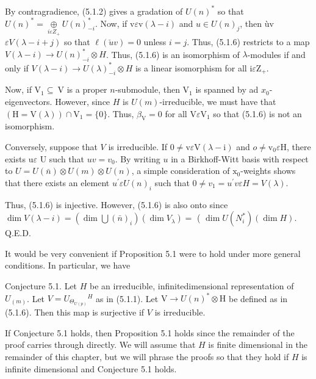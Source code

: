 \documentclass[10pt]{article}
\begin{document}
By contragradience, (5.1.2) gives a gradation of $U(n)^{*}$ so that $U(n)^{*}=\underset{i \varepsilon Z_{+}}{\oplus} U(n)_{-i}^{*}$. Now, if $\mathrm{v} \varepsilon \mathrm{v}(\lambda-i)$ and $u \in U(n)_{j}$, then ùv $\varepsilon V(\lambda-i+j)$ so that $\ell(\check{u} v)=0$ unless $i=j$. Thus, (5.1.6) restricts to a map $V(\lambda-i) \rightarrow U(n)_{-i}^{*} \otimes H$. Thus, (5.1.6) is an isomorphism of $\lambda$-modules if and only if $V(\lambda-i) \rightarrow U(\lambda)_{-i}^{*} \otimes H$ is a linear isomorphism for all $\mathrm{i} \varepsilon \mathrm{Z}_{+}$.

Now, if $\mathrm{V}_{1} \subseteq \mathrm{~V}$ is a proper $n$-submodule, then $\mathrm{V}_{1}$ is spanned by ad $x_{0}$-eigenvectors. However, since $H$ is $U(m)$-irreducible, we must have that $(\mathrm{H}=\mathrm{V}(\lambda)) \cap \mathrm{V}_{1}=\{0\}$. Thus, $\beta_{\mathrm{V}}=0$ for all $\mathrm{V} \varepsilon \mathrm{V}_{1}$ so that (5.1.6) is not an isomorphism.

Conversely, suppose that $V$ is irreducible. If $0 \neq \mathrm{v} \varepsilon \mathrm{V}(\lambda-\mathrm{i})$ and $o \neq \mathrm{v}_{0} \varepsilon \mathrm{H}$, there exists $\mathrm{u} \varepsilon$ U such that $u v=v_{0}$. By writing $u$ in a Birkhoff-Witt basis with respect to $U=U(\bar{n}) \otimes U(m) \otimes U(n)$, a simple consideration of $\mathrm{x}_{0}$-weights shows that there exists an element $u^{\prime} \varepsilon U(n)_{i}$ such that $0 \neq v_{1}=u^{\prime} v \varepsilon H=V(\lambda)$.

Thus, (5.1.6) is injective. However, (5.1.6) is also onto since $\operatorname{dim} V(\lambda-i)=\left(\operatorname{dim} \bigcup(\bar{n})_{i}\right)\left(\operatorname{dim} V_{\lambda}\right)=$ ( $\operatorname{dim} U\left(N_{i}^{*}\right)(\operatorname{dim} H)$.\\
Q.E.D.

It would be very convenient if Proposition 5.1 were to hold under more general conditions. In particular, we have

Conjecture 5.1. Let $H$ be an irreducible, infinitedimensional representation of $U_{(m)}$. Let $V=U_{\Theta_{U(p)}}{ }^{H}$ as in (5.1.1). Let $\mathrm{V} \rightarrow U(n)^{*} \otimes \mathrm{H}$ be defined as in (5.1.6). Then this map is surjective if $V$ is irreducible.

If Conjecture 5.1 holds, then Proposition 5.1 holds since the remainder of the proof carries through directly. We will assume that $H$ is finite dimensional in the remainder of this chapter, but we will phrase the proofs so that they hold if $H$ is infinite dimensional and Conjecture 5.1 holds.
\end{document}

